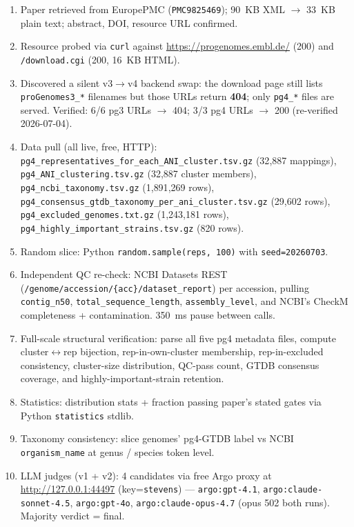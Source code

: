 \documentclass[11pt]{article}
\begin{document}
\begin{enumerate}[leftmargin=1.5em]
  \item Paper retrieved from EuropePMC (\texttt{PMC9825469}); 90~KB XML $\to$ 33~KB plain text; abstract, DOI, resource URL confirmed.
  \item Resource probed via \texttt{curl} against \url{https://progenomes.embl.de/} (200) and \texttt{/download.cgi} (200, 16~KB HTML).
  \item Discovered a silent v3$\to$v4 backend swap: the download page still lists \texttt{proGenomes3\_*} filenames but those URLs return \textbf{404}; only \texttt{pg4\_*} files are served. Verified: 6/6 pg3 URLs $\to$ 404; 3/3 pg4 URLs $\to$ 200 (re-verified 2026-07-04).
  \item Data pull (all live, free, HTTP): \texttt{pg4\_representatives\_for\_each\_ANI\_cluster.tsv.gz} (32{,}887 mappings), \texttt{pg4\_ANI\_clustering.tsv.gz} (32{,}887 cluster members), \texttt{pg4\_ncbi\_taxonomy.tsv.gz} (1{,}891{,}269 rows), \texttt{pg4\_consensus\_gtdb\_taxonomy\_per\_ani\_cluster.tsv.gz} (29{,}602 rows), \texttt{pg4\_excluded\_genomes.txt.gz} (1{,}243{,}181 rows), \texttt{pg4\_highly\_important\_strains.tsv.gz} (820 rows).
  \item Random slice: Python \texttt{random.sample(reps, 100)} with \texttt{seed=20260703}.
  \item Independent QC re-check: NCBI Datasets REST (\texttt{/genome/accession/\{acc\}/dataset\_report}) per accession, pulling \texttt{contig\_n50}, \texttt{total\_sequence\_length}, \texttt{assembly\_level}, and NCBI's CheckM completeness + contamination. 350~ms pause between calls.
  \item Full-scale structural verification: parse all five pg4 metadata files, compute cluster$\leftrightarrow$rep bijection, rep-in-own-cluster membership, rep-in-excluded consistency, cluster-size distribution, QC-pass count, GTDB consensus coverage, and highly-important-strain retention.
  \item Statistics: distribution stats + fraction passing paper's stated gates via Python \texttt{statistics} stdlib.
  \item Taxonomy consistency: slice genomes' pg4-GTDB label vs NCBI \texttt{organism\_name} at genus / species token level.
  \item LLM judges (v1 + v2): 4 candidates via free Argo proxy at \url{http://127.0.0.1:44497} (key=\texttt{stevens}) --- \texttt{argo:gpt-4.1}, \texttt{argo:claude-sonnet-4.5}, \texttt{argo:gpt-4o}, \texttt{argo:claude-opus-4.7} (opus 502 both runs). Majority verdict = final.
\end{enumerate}
\end{document}
